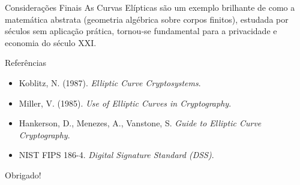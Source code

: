 \documentclass[aspectratio=169]{beamer}
\begin{document}
\begin{frame}{Considerações Finais}
  As Curvas Elípticas são um exemplo brilhante de como a matemática abstrata (geometria algébrica sobre corpos finitos), estudada por séculos sem aplicação prática, tornou-se fundamental para a privacidade e economia do século XXI.
\end{frame}

\begin{frame}{Referências}
  \begin{itemize}
      \item Koblitz, N. (1987). \textit{Elliptic Curve Cryptosystems}.
      \item Miller, V. (1985). \textit{Use of Elliptic Curves in Cryptography}.
      \item Hankerson, D., Menezes, A., Vanstone, S. \textit{Guide to Elliptic Curve Cryptography}.
      \item NIST FIPS 186-4. \textit{Digital Signature Standard (DSS)}.
  \end{itemize}
\end{frame}

\begin{frame}
  \begin{center}
      \Huge Obrigado!
  \end{center}
\end{frame}
\end{document}
